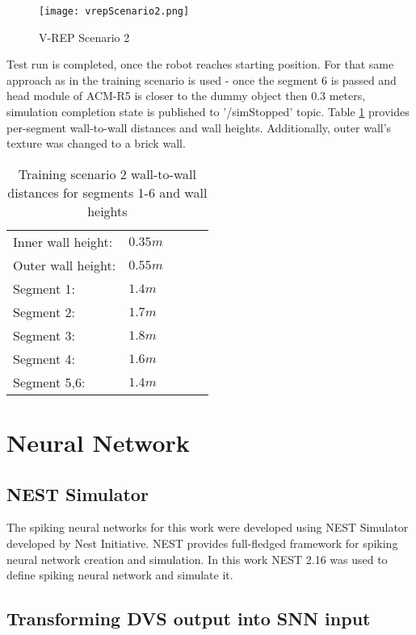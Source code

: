 \begin{figure}[h]
	\begin{center}
		\texttt{[image: vrepScenario2.png]}
		\caption{V-REP Scenario 2 \label{fig:vrepScenario2}}  
	\end{center}
\end{figure}

Test run is completed, once the robot reaches starting position. For that same approach as in the training scenario is used - once the segment 6 is passed and head module of ACM-R5 is closer to the dummy object then 0.3 meters, simulation completion state is published to '/simStopped' topic. Table \ref{tableTestingScenario2} provides per-segment wall-to-wall distances and wall heights. Additionally, outer wall's texture was changed to a brick wall. 

\begin{table}[h]
	\centering
	\caption{Training scenario 2 wall-to-wall distances for segments 1-6 and wall heights}
	\begin{tabular}{lllll}
		\cline{1-2}
		 Inner wall height:& \(0.35 m\)&\\
		 Outer wall height:& \(0.55 m\)&\\
		 Segment 1:&  \(1.4 m\)&  \\ 
		 Segment 2:&  \(1.7 m\)&  \\
		 Segment 3:&  \(1.8 m\)&  \\
		 Segment 4:& \(1.6 m\)&\\
 		 Segment 5,6:& \(1.4 m\)&\\
		\cline{1-2}
	\end{tabular}
\label{tableTestingScenario2}
\end{table}

\section{Neural Network}\label{nest}
\subsection{NEST Simulator}
The spiking neural networks for this work were developed using NEST Simulator developed by Nest Initiative. NEST provides full-fledged framework for spiking neural network creation and simulation. In this work NEST 2.16 was used to define spiking neural network and simulate it.
\subsection{Transforming DVS output into SNN input}\label{sectionDVStoSNN}

